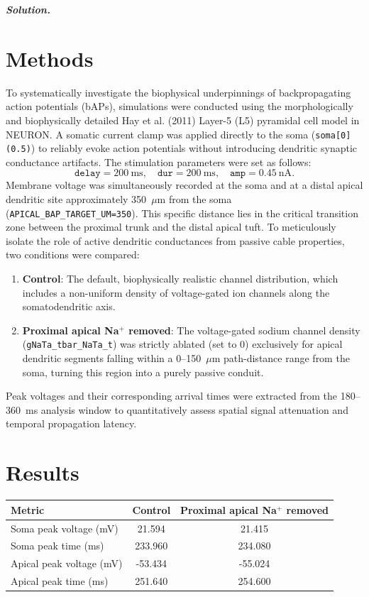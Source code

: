 \documentclass{article}
\newenvironment{solution}{%
    \par\noindent\begin{solutionbox}\textbf{\textit{Solution.}}\par\medskip\itshape
}{%
    \end{solutionbox}
}
\begin{document}
\begin{solution}

\section*{Methods}
To systematically investigate the biophysical underpinnings of backpropagating action potentials (bAPs), simulations were conducted using the morphologically and biophysically detailed Hay et al. (2011) Layer-5 (L5) pyramidal cell model in NEURON. A somatic current clamp was applied directly to the soma (\texttt{soma[0](0.5)}) to reliably evoke action potentials without introducing dendritic synaptic conductance artifacts. The stimulation parameters were set as follows:
\[
\texttt{delay}=200~\text{ms},\quad \texttt{dur}=200~\text{ms},\quad \texttt{amp}=0.45~\text{nA}.
\]
Membrane voltage was simultaneously recorded at the soma and at a distal apical dendritic site approximately 350~\(\mu\)m from the soma (\texttt{APICAL\_BAP\_TARGET\_UM=350}). This specific distance lies in the critical transition zone between the proximal trunk and the distal apical tuft. To meticulously isolate the role of active dendritic conductances from passive cable properties, two conditions were compared:
\begin{enumerate}
  \item \textbf{Control}: The default, biophysically realistic channel distribution, which includes a non-uniform density of voltage-gated ion channels along the somatodendritic axis.
  \item \textbf{Proximal apical Na\(^+\) removed}: The voltage-gated sodium channel density (\texttt{gNaTa\_tbar\_NaTa\_t}) was strictly ablated (set to 0) exclusively for apical dendritic segments falling within a 0--150~\(\mu\)m path-distance range from the soma, turning this region into a purely passive conduit.
\end{enumerate}
Peak voltages and their corresponding arrival times were extracted from the 180--360~ms analysis window to quantitatively assess spatial signal attenuation and temporal propagation latency.

\section*{Results}
\begin{center}
\begin{tabular}{lcc}
\toprule
\textbf{Metric} & \textbf{Control} & \textbf{Proximal apical Na\(^+\) removed} \\
\midrule
Soma peak voltage (mV) & 21.594 & 21.415 \\
Soma peak time (ms) & 233.960 & 234.080 \\
Apical peak voltage (mV) & -53.434 & -55.024 \\
Apical peak time (ms) & 251.640 & 254.600 \\
\bottomrule
\end{tabular}
\end{center}


\end{solution}
\end{document}
